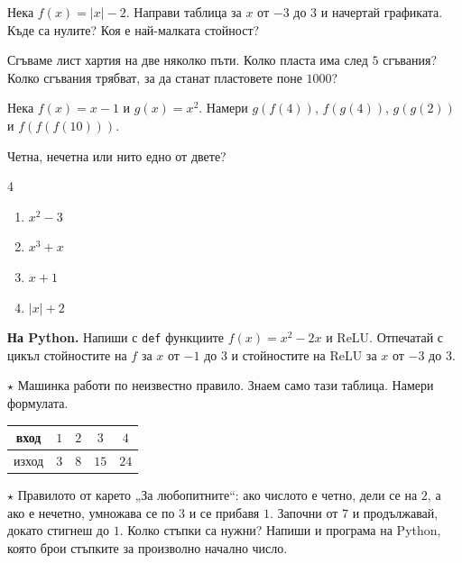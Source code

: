 \documentclass[11pt,a4paper]{article}
\makeatletter
\newcommand{\st}{\textcolor{corange}{$\star$}}
\newcommand{\bgalph}[1]{\expandafter\@bgalph\csname c@#1\endcsname}
\newcommand{\@bgalph}[1]{\ifcase#1\or а\or б\or в\or г\or д\or е\or ж\or з\or и\or к\fi}
\makeatother
\begin{document}
\begin{tasks}
  \item Нека $f(x)=|x|-2$. Направи таблица за $x$ от $-3$ до $3$ и начертай графиката. Къде са нулите? Коя е най-малката стойност?
  \item Сгъваме лист хартия на две няколко пъти. Колко пласта има след $5$ сгъвания? Колко сгъвания трябват, за да станат пластовете поне $1000$?
  \item Нека $f(x)=x-1$ и $g(x)=x^2$. Намери $g(f(4))$, $f(g(4))$, $g(g(2))$ и $f(f(f(10)))$.
  \item Четна, нечетна или нито едно от двете?
  \begin{multicols}{4}
  \begin{enumerate}[label=\bgalph*)]
    \item $x^2-3$
    \item $x^3+x$
    \item $x+1$
    \item $|x|+2$
  \end{enumerate}
  \end{multicols}
  \item \textbf{На Python.} Напиши с \texttt{def} функциите $f(x)=x^2-2x$ и ReLU. Отпечатай с цикъл стойностите на $f$ за $x$ от $-1$ до $3$ и стойностите на ReLU за $x$ от $-3$ до $3$.
  \item \st{} Машинка работи по неизвестно правило. Знаем само тази таблица. Намери формулата.
  \begin{center}
  \begin{tabular}{c|cccc} вход & $1$ & $2$ & $3$ & $4$\\\hline изход & $3$ & $8$ & $15$ & $24$\end{tabular}
  \end{center}
  \item \st{} Правилото от карето „За любопитните“: ако числото е четно, дели се на $2$, а ако е нечетно, умножава се по $3$ и се прибавя $1$. Започни от $7$ и продължавай, докато стигнеш до $1$. Колко стъпки са нужни? Напиши и програма на Python, която брои стъпките за произволно начално число.
\end{tasks}
\end{document}
